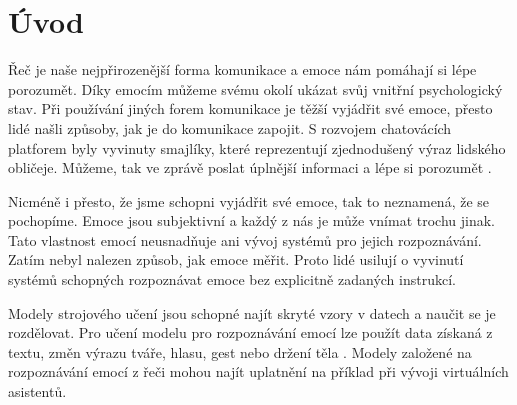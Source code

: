 \documentclass[FM,BP]{tulthesis}
\begin{document}

\begin{abstractCZ}
\end{abstractCZ}

\begin{keywordsCZ}
\end{keywordsCZ}

\vspace{2cm}

\begin{abstractEN}
\end{abstractEN}

\begin{keywordsEN}
\end{keywordsEN}

\clearpage

\begin{acknowledgement}
\end{acknowledgement}

\tableofcontents

\clearpage

\begin{abbrList}
\end{abbrList}

\chapter{Úvod} %
Řeč je naše nejpřirozenější forma komunikace a emoce nám pomáhají si lépe porozumět. Díky emocím můžeme svému okolí ukázat svůj vnitřní psychologický stav. Při používání jiných forem komunikace je těžší vyjádřit své emoce, přesto lidé našli způsoby, jak je do komunikace zapojit. S rozvojem chatovácích platforem byly vyvinuty smajlíky, které reprezentují zjednodušený výraz lidského obličeje. Můžeme, tak ve zprávě poslat úplnější informaci a lépe si porozumět \cite{DBLP:journals/speech/AkcayO20}.

Nicméně i přesto, že jsme schopni vyjádřit své emoce, tak to neznamená, že se pochopíme. Emoce jsou subjektivní a každý z nás je může vnímat trochu jinak. Tato vlastnost emocí neusnadňuje ani vývoj systémů pro jejich rozpoznávání. Zatím nebyl nalezen způsob, jak emoce měřit. Proto lidé usilují o vyvinutí systémů schopných rozpoznávat emoce bez explicitně zadaných instrukcí.

Modely strojového učení jsou schopné najít skryté vzory v datech a naučit se je rozdělovat. Pro učení modelu pro rozpoznávání emocí lze použít data získaná z textu, změn výrazu tváře, hlasu, gest nebo držení těla \cite{konar_chakraborty_2015}. Modely založené na rozpoznávání emocí z řeči mohou najít uplatnění na příklad při vývoji virtuálních asistentů. 
\end{document}
